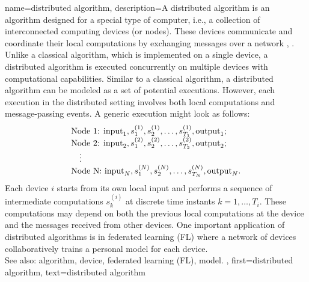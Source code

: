 {name={distributed algorithm},
	description={A distributed algorithm is an algorithm designed for 
		a special type of computer, i.e., a collection of interconnected computing devices (or nodes). 
		These devices communicate and coordinate their local computations by exchanging 
		messages over a network \cite{IntroDistAlg}, \cite{ParallelDistrBook}. Unlike a classical algorithm, 
		which is implemented on a single device, a distributed algorithm is 
		executed concurrently on multiple devices with computational capabilities. 
		Similar to a classical algorithm, a distributed algorithm can be modeled as a 
		set of potential executions. However, each execution in the distributed setting involves 
		both local computations and message-passing events. A generic execution might look as 
		follows:
		\[
		\begin{array}{l}
			\text{Node 1: } {\rm input}_1, s_1^{(1)}, s_2^{(1)}, \ldots, s_{T_1}^{(1)}, {\rm output}_1; \\
			\text{Node 2: } {\rm input}_2, s_1^{(2)}, s_2^{(2)}, \ldots, s_{T_2}^{(2)}, {\rm output}_2; \\
			\quad \vdots \\
			\text{Node N: } {\rm input}_N, s_1^{(N)}, s_2^{(N)}, \ldots, s_{T_N}^{(N)}, {\rm output}_N.
		\end{array}
		\]
		Each device $i$ starts from its own local input and performs a sequence of 
		intermediate computations $s_{k}^{(i)}$ at discrete time instants $k = 1, \dots, T_i$. 
		These computations may depend on both the previous local computations at the device 
		and the messages received from other devices. One important application of distributed 
		algorithms is in federated learning (FL) where a network of devices collaboratively trains a personal model 
		for each device. 
					\\ 
		See also: algorithm, device, federated learning (FL), model.
		},
	first={distributed algorithm}, text={distributed algorithm}
}


